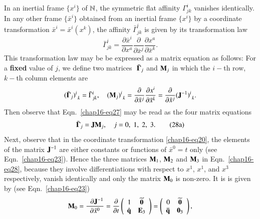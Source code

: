 In an inertial frame $\{x^i\}$ of $\mathbb{N}$, the symmetric flat affinity $\Gamma^i_{jk}$ vanishes identically. In any other frame $\{\bar{x}^i\}$ obtained from an inertial frame $\{x^i\}$ by a coordinate transformation $\bar{x}^i=\bar{x}^i(x^k)$,  the affinity $\bar{\Gamma}^i_{jk}$ is given by its  transformation law
\begin{equation}
\bar{\Gamma}^i_{jk}=\frac{\partial \bar{x}^i}{\partial x^a} \frac{\partial}{\partial \bar{x}^j}\frac{\partial x^a} {\partial \bar{x}^k}.\label{chap16-eq27}
\end{equation}
This transformation law may be  be expressed as a matrix equation as follows: For a \textbf{fixed} value of  $j$, we define two matrices  $\bar{\,\,\bm{\Gamma}_j} $ and ${\mathbf{M}}_j$ in which the $i-$th row, $k-$th column elements are
\begin{equation}
(\bar{\bm{\Gamma}}_j)^i_{\;\,k}=\bar{\Gamma}^i_{jk} , \quad ({\mathbf{M}}_j )^i_{\;\,k}= \frac{\partial}{\partial \bar{x}^j}\frac{\partial x^i} {\partial \bar{x}^k} =\frac{\partial}{\partial \bar{x}^j} ({\mathbf{J}^{-1}})^i_{\;\,k}.\label{chap16-eq28}
\end{equation}
Then observe that Eqn.~\eqref{chap16-eq27} may be read as the four matrix equations  
\begin{equation*}
\bar{\bm{\Gamma}}_j= {\mathbf{J}}{\mathbf{M}}_j,\quad j=0,\;1,\;2,\;3.\tag{28a}\label{chap16-eq28a}
\end{equation*}
Next, observe that in the coordinate transformation \eqref{chap16-eq20}, the elements of the matrix  $\mathbf{J}^{-1}$ are either constants or  functions of  $\bar{x}^0=t$ only (see Eqn.~\eqref{chap16-eq23}). Hence the three matrices  ${\mathbf{M}}_1$, ${\mathbf{M}}_2$ and  ${\mathbf{M}}_3$ in Eqn.~\eqref{chap16-eq28}, because they involve differentiations with respect to $x^1$, $x^1$, and $x^3$ respectively, vanish identically and only the matrix  ${\mathbf{M}}_0$ is non-zero. It is is given by (see Eqn.~\eqref{chap16-eq23})
\begin{equation}
{\mathbf{M}}_0=\frac{\;\;\partial{\mathbf{J}}^{-1}} {\partial\bar{x} ^0} =\frac{\partial}{\partial t}\left(\begin{array}{rc} 1 &\widetilde{\mathbf{0}}  \\ \mathbf{\dot{q}} 
 & \mathbf{E}_3 \end{array}\right)=\left(\begin{array}{rc} 0 & \widetilde{\mathbf{0}} \\ \mathbf{\ddot{q}}  & \mathbf{0}_3 \end{array}\right),\label{chap16-eq29}
\end{equation}
